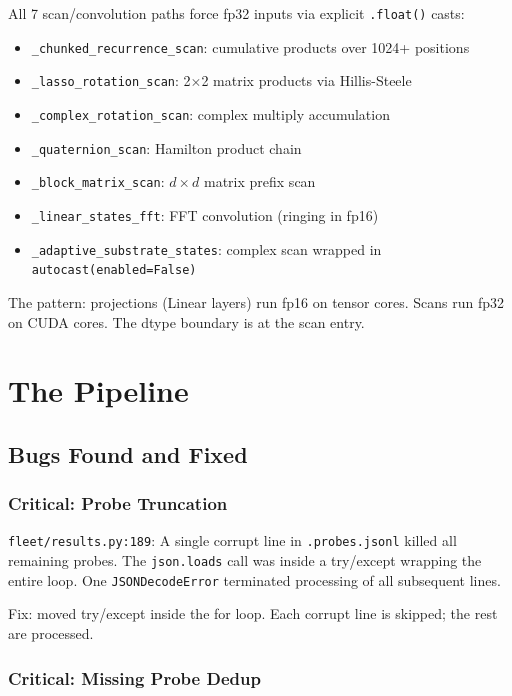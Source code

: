 \documentclass[11pt,a4paper]{report}
\begin{document}
All 7 scan/convolution paths force fp32 inputs via explicit \texttt{.float()} casts:

\begin{itemize}[nosep]
\item \texttt{\_chunked\_recurrence\_scan}: cumulative products over 1024+ positions
\item \texttt{\_lasso\_rotation\_scan}: 2$\times$2 matrix products via Hillis-Steele
\item \texttt{\_complex\_rotation\_scan}: complex multiply accumulation
\item \texttt{\_quaternion\_scan}: Hamilton product chain
\item \texttt{\_block\_matrix\_scan}: $d \times d$ matrix prefix scan
\item \texttt{\_linear\_states\_fft}: FFT convolution (ringing in fp16)
\item \texttt{\_adaptive\_substrate\_states}: complex scan wrapped in \texttt{autocast(enabled=False)}
\end{itemize}

The pattern: projections (Linear layers) run fp16 on tensor cores. Scans run fp32 on CUDA cores. The dtype boundary is at the scan entry.


\part{The Pipeline}

\chapter{Bugs Found and Fixed}

\section{Critical: Probe Truncation}

\texttt{fleet/results.py:189}: A single corrupt line in \texttt{.probes.jsonl} killed all remaining probes. The \texttt{json.loads} call was inside a try/except wrapping the entire loop. One \texttt{JSONDecodeError} terminated processing of all subsequent lines.

Fix: moved try/except inside the for loop. Each corrupt line is skipped; the rest are processed.

\section{Critical: Missing Probe Dedup}
\end{document}
